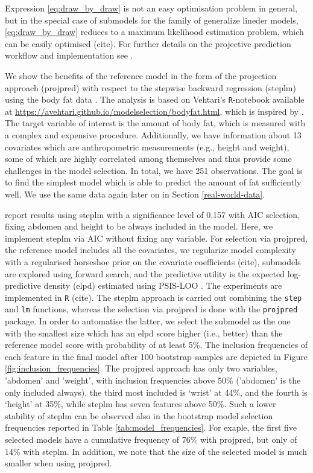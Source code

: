 \documentclass[american,]{article}
\theoremstyle{definition}
\begin{document}
Expression \eqref{eq:draw_by_draw} is not an easy optimisation problem in general, but in the special case of submodels for the family of generalize lineder models, \eqref{eq:draw_by_draw} reduces to a maximum likelihood estimation problem, which can be easily optimised (cite). For further details on the projective prediction workflow and implementation see \cite{paper:projpred}.

We show the benefits of the reference model in the form of the projection approach (projpred) with respect to the stepwise backward regression (steplm) using the body fat data \citep{johnson1996fitting}. The analysis is based on Vehtari's \texttt{R}-notebook available at \url{https://avehtari.github.io/modelselection/bodyfat.html}, which is inspired by \cite{paper:bodyfat}. The target variable of interest is the amount of body fat, which is measured with a complex and expensive procedure. Additionally, we have information about 13 covariates which are anthropometric measurements (e.g., height and weight), some of which are highly correlated among themselves and thus provide some challenges in the model selection. In total, we have 251 observations. The goal is to find the simplest model which is able to predict the amount of fat sufficiently well. We use the same data again later on in Section \ref{real-world-data}.

\cite{paper:bodyfat} report results using steplm with a significance level of 0.157 with AIC selection, fixing abdomen and height to be always included in the model. Here, we implement steplm via AIC without fixing any variable. For selection via projpred, the reference model includes all the covariates, we regularize model complexity with a regularised horseshoe prior on the covariate coefficients (cite), submodels are explored using forward search, and the predictive utility is the expected log-predictive density (elpd) estimated using PSIS-LOO \citep{paper:psis_loo}. The experiments are implemented in \texttt{R} (cite). The steplm approach is carried out combining the \texttt{step} and \texttt{lm} functions, whereas the selection via projpred is done with the \texttt{projpred} package. In order to automatise the latter, we select the submodel as the one with the smallest size which has an elpd score higher (i.e., better) than the reference model score with probability of at least 5\%. The inclusion frequencies of each feature in the final model after 100 bootstrap samples are depicted in Figure \ref{fig:inclusion_frequencies}. The projpred approach has only two variables, 'abdomen' and 'weight', with inclusion frequencies above 50\% ('abdomen' is the only included always), the third most included is `wrist' at 44\%, and the fourth is `height' at 35\%, while steplm has seven features above 50\%. Such a lower stability of steplm can be observed also in the bootstrap model selection frequencies reported in Table \ref{tab:model_frequencies}. For exaple, the first five selected models have a cumulative frequency of 76\% with projpred, but only of 14\% with steplm. In addition, we note that the size of the selected model is much smaller when using projpred.
\end{document}
